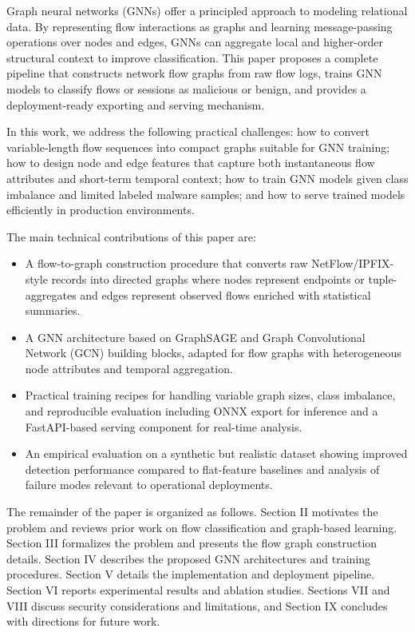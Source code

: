 \documentclass[conference]{IEEEtran}
\begin{document}
Graph neural networks (GNNs) offer a principled approach to modeling relational data. By representing flow interactions as graphs and learning message-passing operations over nodes and edges, GNNs can aggregate local and higher-order structural context to improve classification. This paper proposes a complete pipeline that constructs network flow graphs from raw flow logs, trains GNN models to classify flows or sessions as malicious or benign, and provides a deployment-ready exporting and serving mechanism.

In this work, we address the following practical challenges: how to convert variable-length flow sequences into compact graphs suitable for GNN training; how to design node and edge features that capture both instantaneous flow attributes and short-term temporal context; how to train GNN models given class imbalance and limited labeled malware samples; and how to serve trained models efficiently in production environments.

The main technical contributions of this paper are:

\begin{itemize}
	\item A flow-to-graph construction procedure that converts raw NetFlow/IPFIX-style records into directed graphs where nodes represent endpoints or tuple-aggregates and edges represent observed flows enriched with statistical summaries.
	\item A GNN architecture based on GraphSAGE and Graph Convolutional Network (GCN) building blocks, adapted for flow graphs with heterogeneous node attributes and temporal aggregation.
	\item Practical training recipes for handling variable graph sizes, class imbalance, and reproducible evaluation including ONNX export for inference and a FastAPI-based serving component for real-time analysis.
	\item An empirical evaluation on a synthetic but realistic dataset showing improved detection performance compared to flat-feature baselines and analysis of failure modes relevant to operational deployments.
\end{itemize}

The remainder of the paper is organized as follows. Section II motivates the problem and reviews prior work on flow classification and graph-based learning. Section III formalizes the problem and presents the flow graph construction details. Section IV describes the proposed GNN architectures and training procedures. Section V details the implementation and deployment pipeline. Section VI reports experimental results and ablation studies. Sections VII and VIII discuss security considerations and limitations, and Section IX concludes with directions for future work.
\end{document}
